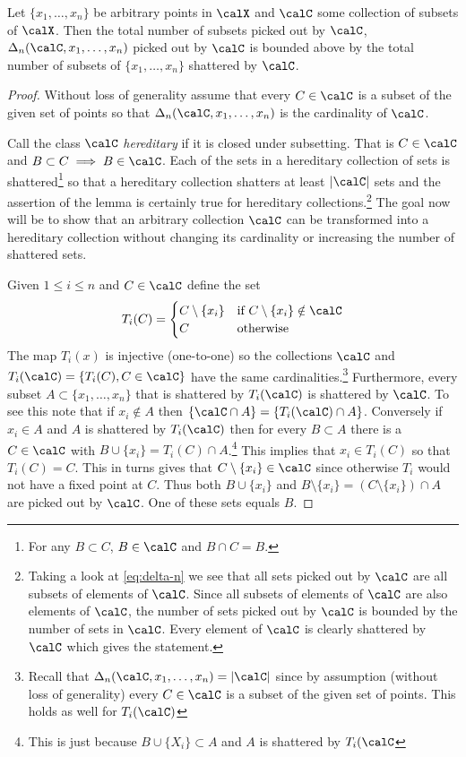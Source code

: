 \begin{lemma}
	\label{lemma:vdv2.6.2}
	Let \(\{x_1,\dots,x_n\}\) be arbitrary points in \(\calX\) and \(\calC\) some collection of subsets of \(\calX\). Then the total number of subsets picked out by \(\calC\), \(\Delta_n(\calC,x_1,\dots,x_n)\) picked out by \(\calC\) is bounded above by the total number of subsets of \(\{x_1,\dots,x_n\}\) shattered by \(\calC\).
\end{lemma}
\begin{proof}
	Without loss of generality assume that every \(C \in\calC\) is a subset of the given set of points so that \(\Delta_n(\calC,x_1,\dots,x_n)\) is the cardinality of \(\calC\).

	Call the class \(\calC\) \textit{hereditary} if it is closed under subsetting. That is \(C\in\calC\) and \(B \subset C\implies B \in\calC\). Each of the sets in a hereditary collection of sets is shattered\footnote{For any \(B \subset C\), \(B \in\calC\) and \(B \cap C = B\).} so that a hereditary collection shatters at least \(|\calC|\) sets and the assertion of the lemma is certainly true for hereditary collections.\footnote{Taking a look at \eqref{eq:delta-n} we see that all sets picked out by \(\calC\) are all subsets of elements of \(\calC\). Since all subsets of elements of \(\calC\) are also elements of \(\calC\), the number of sets picked out by \(\calC\) is bounded by the number of sets in \(\calC\). Every element of \(\calC\) is clearly shattered by \(\calC\) which gives the statement.} The goal now will be to show that an arbitrary collection \(\calC\) can be transformed into a hereditary collection
	without changing its cardinality or increasing the number of shattered sets.

	Given \(1 \leq i \leq n\) and \(C\in\calC\) define the set
	\[
		T_i(C) 
		= \begin{cases}
		C\setminus\{x_i\}  & \text{if } C\setminus\{x_i\}\notin\calC \\
		C &\text{otherwise }
		\end{cases}
	\]
	The map \(T_i(x)\) is injective (one-to-one) so the collections \(\calC\) and \(T_i(\calC) = \{T_i(C), C \in\calC\} \) have the same cardinalities.\footnote{Recall that \(\Delta_n(\calC,x_1,\dots,x_n) = |\calC|\) since by assumption (without loss of generality) every \(C\in\calC\) is a subset of the given set of points. This holds as well for \(T_i(\calC)\)} Furthermore, every subset \(A\subset \{x_1,\dots,x_n\}\) that is shattered by \(T_i(\calC)\) is shattered by \(\calC\). To see this note that if \(x_i\not\in A\) then \(\{\calC\cap A\} = \{T_i(\calC) \cap A\}\). Conversely if \(x_i\in A\) and \(A\) is shattered by \(T_i(\calC)\) then for every \(B\subset A\) there is a \(C\in\calC\) with \(B \cup \{x_i\} = T_i(C)\cap A\).\footnote{This is just because \(B\cup\{X_i\}\subset A\) and \(A\) is shattered by \(T_i(\calC\)} This implies that \(x_i\in T_i(C)\) so that \(T_i(C)=C\). This in turns gives that \(C\setminus\{x_i\}\in\calC\) since otherwise \(T_i\) would not have a fixed point at \(C\). Thus both \(B\cup\{x_i\}\) and \(B\setminus\{x_i\} = (C\setminus\{x_i\}) \cap A\) are picked out by \(\calC\). One of these sets equals \(B\).
	

\end{proof}
